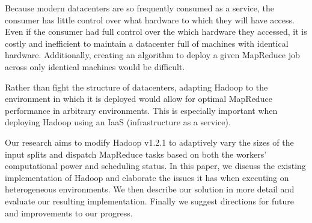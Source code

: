 \documentclass{sig-alternate}
\begin{document}
Because modern datacenters are so frequently consumed as a service, the consumer
has little control over what hardware to which they will have access. Even if the
consumer had full control over the which hardware they accessed, it is costly and
inefficient to maintain a datacenter full of machines with identical hardware.
Additionally, creating an algorithm to deploy a given MapReduce job across only
identical machines would be difficult.

Rather than fight the structure of datacenters, adapting Hadoop to the environment
in which it is deployed would allow for optimal MapReduce performance in arbitrary
environments. This is especially important when deploying Hadoop using an IaaS
(infrastructure as a service).

Our research aims to modify Hadoop v1.2.1 to adaptively vary the sizes of the input
splits and dispatch MapReduce tasks based on both the workers' computational power
and scheduling status. In this paper, we discuss the existing implementation of Hadoop
and elaborate the issues it has when executing on heterogeneous environments. We then
describe our solution in more detail and evaluate our resulting implementation. Finally
we suggest directions for future and improvements to our progress.








{}

\end{document}
